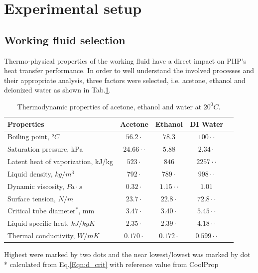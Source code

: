 \documentclass[article]{elsarticle}
\begin{document}
\section{Experimental setup}
\subsection{Working fluid selection}

Thermo-physical properties of the working fluid have a direct impact on PHP's heat transfer performance. In order to well understand the involved processes and their appropriate analysis, three factors were selected, i.e. acetone, ethanol and deionized water as shown in Tab.\ref{table:properties}.

\begin{table}[H]
\caption{Thermodynamic properties of acetone, ethanol and water at $20^0C$.}
	\centering
	\begin{tabular}{lcccc}
	\hline
		Properties & Acetone& Ethanol & DI Water\\
	\hline
		Boiling point, $^oC$ & $56.2\cdot$& $78.3$ & $100\cdot\cdot$\\
        Saturation pressure, kPa & $24.66\cdot\cdot$ & $5.88$ & $2.34\cdot$\\
		Latent heat of vaporization, kJ/kg & $523\cdot$ & $846$ & $2257\cdot\cdot$\\
		Liquid density, $kg/m^{3}$ & $792\cdot$ & $789\cdot$ & $998\cdot\cdot$\\
		Dynamic viscosity, $Pa\cdot s$ & $0.32\cdot$ & $1.15\cdot\cdot$ & $1.01$\\
        Surface tension, $N/m$ & $23.7\cdot$ & $22.8\cdot$ & $72.8\cdot\cdot$\\
        Critical tube diameter$^*$, mm & $3.47\cdot$ & $3.40\cdot$ & $5.45\cdot\cdot$\\
        Liquid specific heat, $kJ/kgK$ & $2.35\cdot$ & $2.39\cdot$ & $4.18\cdot\cdot$\\
        Thermal conductivity, $W/mK$ & $0.170\cdot$ & $0.172\cdot$ & $0.599\cdot\cdot$\\
	\hline
	\end{tabular}
    	\begin{tablenotes}
		\item[\textdagger]\small{Highest were marked by two dots and the near lowest/lowest was marked by dot \\ * calculated from Eq.\ref{Eqn:d_crit} with reference value from CoolProp}
	\end{tablenotes}
	\label{table:properties}
\end{table}
\end{document}

